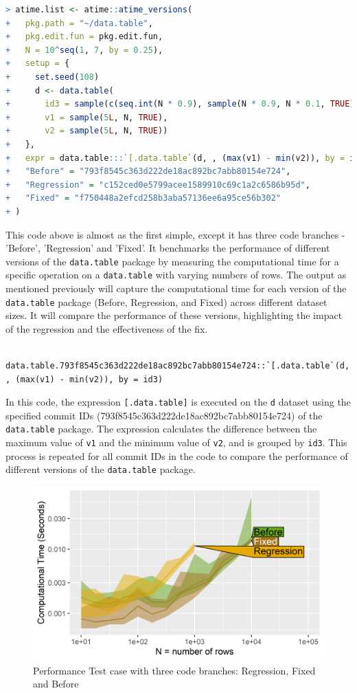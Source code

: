 \begin{lstlisting}[language=R]
> atime.list <- atime::atime_versions(
+   pkg.path = "~/data.table",
+   pkg.edit.fun = pkg.edit.fun,
+   N = 10^seq(1, 7, by = 0.25),
+   setup = { 
+     set.seed(108)
+     d <- data.table(
+       id3 = sample(c(seq.int(N * 0.9), sample(N * 0.9, N * 0.1, TRUE))),
+       v1 = sample(5L, N, TRUE),
+       v2 = sample(5L, N, TRUE))
+   },
+   expr = data.table:::`[.data.table`(d, , (max(v1) - min(v2)), by = id3),
+   "Before" = "793f8545c363d222de18ac892bc7abb80154e724",
+   "Regression" = "c152ced0e5799acee1589910c69c1a2c6586b95d",
+   "Fixed" = "f750448a2efcd258b3aba57136ee6a95ce56b302"
+ )
\end{lstlisting}

\noindent This code above is almost as the first simple, except it has three code branches - 'Before', 'Regression' and 'Fixed'. It benchmarks the performance of different versions of the \texttt{data.table} package by measuring the computational time for a specific operation on a \texttt{data.table} with varying numbers of rows.
The output as mentioned previously will capture the computational time for each version of the \texttt{data.table} package (Before, Regression, and Fixed) across different dataset sizes. It will compare the performance of these versions, highlighting the impact of the regression and the effectiveness of the fix. \\

    \begin{verbatim}
    data.table.793f8545c363d222de18ac892bc7abb80154e724::`[.data.table`(d, , (max(v1) - min(v2)), by = id3)  
    \end{verbatim}
    
\vspace{0.1in}
\noindent In this code, the expression \texttt{[.data.table]} is executed on the \texttt{d} dataset using the specified commit IDs (793f8545c363d222de18ac892bc7abb80154e724) of the \texttt{data.table} package. The expression calculates the difference between the maximum value of \texttt{v1} and the minimum value of \texttt{v2}, and is grouped by \texttt{id3}. This process is repeated for all commit IDs in the code to compare the performance of different versions of the \texttt{data.table} package.\\

\begin{figure}[H]
    \centering
    \includegraphics[width=0.7\linewidth]{figures/atime.list.4200.png}
    \caption{Performance Test case with three code branches: Regression, Fixed and Before}
    \label{fig:label4}
\end{figure}

